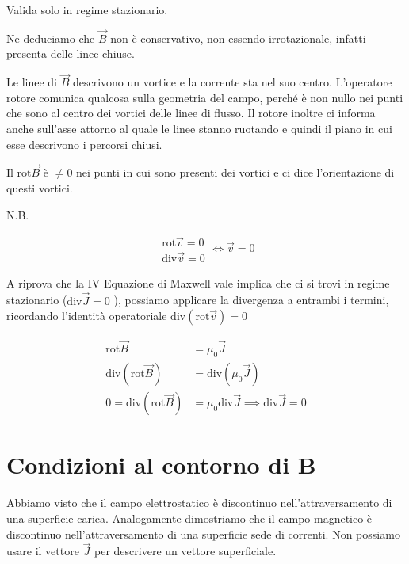 Valida solo in regime stazionario.

Ne deduciamo che $ \vec{B}  $ non è conservativo, non essendo irrotazionale, infatti presenta delle linee chiuse.

Le linee di $\vec{B}$ descrivono un vortice e la corrente sta nel suo centro. L'operatore rotore comunica qualcosa sulla geometria del campo, perché è non nullo nei punti che sono al centro dei vortici delle linee di flusso. Il rotore inoltre ci informa anche sull'asse attorno al quale le linee stanno ruotando e quindi il piano in cui esse descrivono i percorsi chiusi.

Il $ \text{rot}\vec{B}  $ è $ \neq 0 $ nei punti in cui sono presenti dei vortici e ci dice l'orientazione di questi vortici.

N.B.

\[
	\begin{array}{c}
		\text{rot} \vec{v} =0 \\
		\text{div} \vec{v} =0
	\end{array}
	\iff \vec{v} =0
\]

A riprova che la IV Equazione di Maxwell vale implica che ci si trovi in regime stazionario ($ \text{div}\vec{J} =0 $ ), possiamo applicare la divergenza a entrambi i termini, ricordando l'identità operatoriale $ \text{div}(\text{rot}\vec{v} )=0 $

\begin{align*}
	\text{rot}\vec{B}  &= \mu_0 \vec{J}  \\
	\text{div}(\text{rot}\vec{B} ) &=  \text{div}(\mu_0\vec{J} ) \\
	0= \text{div}(\text{rot}\vec{B} ) &= \mu_0 \text{div}\vec{J} \implies \text{div}\vec{J} =0
\end{align*}

\section{Condizioni al contorno di B}

Abbiamo visto che il campo elettrostatico è discontinuo nell'attraversamento di una superficie carica. Analogamente dimostriamo che il campo magnetico è discontinuo nell'attraversamento di una superficie sede di correnti. Non possiamo usare il vettore $\vec{J}$ per descrivere un vettore superficiale.

